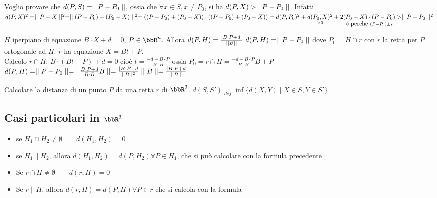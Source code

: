 \documentclass[a4paper,NoNotes,GeneralMath]{stdmdoc}
\begin{document}
	Voglio provare che $d(P,S) = \mid\mid P-P_0 \mid\mid$, ossia che $\forall x\in S, x \neq P_0$, si ha $d(P, X) > \mid\mid P-P_0 \mid\mid$. Infatti $d(P,X)^2 = \mid\mid P-X \mid\mid^2 = \mid\mid (P-P_0)+(P_0-X) \mid\mid^2 = ((P-P_0)+(P_0-X))\cdot((P-P_0)+(P_0-X)) = d(P,P_0)^2 + \underset{> 0}{d(P_0, X)^2} + \underset{= 0 \mbox{ perché } (P-P_0)\bot s}{2(P_0-X)\cdot(P-P_0)} > \mid\mid P-P_0 \mid\mid^2$

	$H$ iperpiano di equazione $B\cdot X + d = 0$, $P \in \bbR^n$. Allora $d(P,H) = \frac{\mid B\cdot P + d \mid}{\mid\mid B \mid\mid}$
	\Dimostrazione $d(P,H) = \mid\mid P-P_0 \mid\mid$ dove $P_0 = H\cap r$ con $r$ la retta per $P$ ortogonale ad $H$. $r$ ha equazione $X = Bt+P$. \\ 
	Calcolo $r\cap H$: $B\cdot(Bt+P)+d=0$ cioè $t = \frac{-d-B\cdot P}{B\cdot B}$ ossia $P_0 = r\cap H = \frac{-d-B\cdot P}{B\cdot B}B + P$ \\
	$d(P,H) = \mid\mid P-P_0 \mid\mid = \mid\mid \frac{B\cdot P+d}{B\cdot B} B \mid\mid = \frac{\mid B\cdot P +d}{\mid\mid B \mid\mid^2} \mid\mid B \mid\mid = \frac{\mid B\cdot P+d}{\mid\mid B \mid\mid}$

	 Calcolare la distanza di un punto $P$ da una retta $r$ di $\bbR^3$.
	 $d(S,S') \underset{def}{=} \inf \{d(X,Y) \mid X\in S, Y\in S'\}$
	
	\subsection*{Casi particolari in $\bbR^3$}
		\begin{itemize}
			\item se $H_1 \cap H_2 \neq \emptyset \qquad d(H_1, H_2) = 0$
			\item se $H_1 \parallel H_2$, allora $d(H_1, H_2) = d(P, H_2) \forall P\in H_1$, che si può calcolare con la formula precedente
		\end{itemize}

		\begin{itemize}
			\item Se $r\cap H\neq\emptyset \qquad d(r, H) = 0$
			\item Se $r \parallel H$, allora $d(r, H) = d(P, H) \forall P\in r$ che si calcola con la formula
		\end{itemize}
\end{document}

